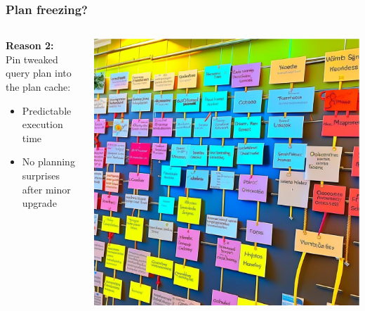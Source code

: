 \documentclass{beamer}
\begin{document}
\begin{frame}[fragile]\frametitle{Plan freezing?}
\begin{columns}\begin{column}{0.6\textwidth}
\textbf{Reason 2:} \\
Pin tweaked query plan into the plan cache:
\begin{itemize}
  \item Predictable execution time
  \item No planning surprises after minor upgrade
\end{itemize}
\end{column}
\begin{column}{0.4\textwidth}
  \begin{center}
    \includegraphics[scale=0.1]{stickers}
  \end{center}
\end{column}\end{columns}
\end{frame}
\end{document}
